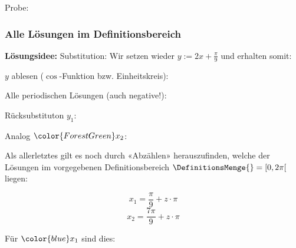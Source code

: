 Probe:

\subsubsection{Alle Lösungen im Definitionsbereich}
\textbf{Lösungsidee:} Substitution:
Wir setzen wieder $y := 2x + \frac{\pi}{9}$ und erhalten somit:



$y$ ablesen ($\cos$-Funktion bzw. Einheitskreis):




Alle periodischen Lösungen (auch negative!):



Rücksubstituton $y_1$:

Analog ${\color{ForestGreen}x_2}$:


Als allerletztes gilt es noch durch «Abzählen» herauszufinden, welche
der Lösungen im vorgegebenen Definitionsbereich $\DefinitionsMenge{} =
[0, 2\pi[$ liegen:

    $$x_1= \frac\pi9 + z\cdot{}\pi$$
    $$x_2= \frac{7\pi}9 + z\cdot{}\pi$$

    Für ${\color{blue}x_1}$ sind dies:


    
      \vspace{5mm}
      

